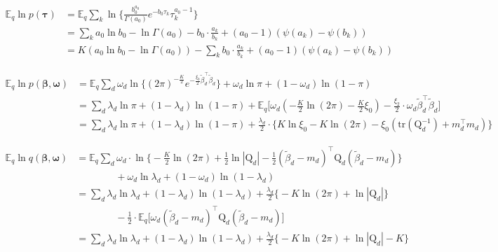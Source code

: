 \documentclass[twoside,11pt]{article}
\newcommand{\transpose}[1]{#1^{\intercal}}
\newcommand{\ksum}{\sum\limits_{k}}
\newcommand{\boldbeta}{\boldsymbol\beta}
\newcommand{\boldomega}{\boldsymbol\omega}
\newcommand{\boldtau}{\boldsymbol\tau}
\newcommand{\E}{\mathbb{E}}
\newcommand{\betad}{\tilde{\beta}_d}
\newcommand{\qmat}{\mathrm{Q}}
\newcommand{\trace}[1]{\mathrm{tr} \left( #1 \right)}
\begin{document}
\begin{align*}
	\E_q \ln p\left( \boldtau \right) &= \E_q \ksum \ln \Big\{ \frac{b_0^{a_0}}{\Gamma(a_0)} e^{-b_0 \tau_k} \tau_k^{a_0 - 1} \Big\} \\
	&= \ksum a_0 \ln b_0 - \ln \Gamma(a_0) - b_0 \cdot \frac{a_k}{b_k} + (a_0 - 1) \left( \psi(a_k) - \psi(b_k) \right) \\
	&= K \left( a_0 \ln b_0 - \ln \Gamma(a_0) \right) - \ksum b_0 \cdot \frac{a_k}{b_k} + (a_0 - 1) \left( \psi(a_k) - \psi(b_k) \right)
\end{align*}


\begin{align*}
	\E_q \ln p\left( \boldbeta, \boldomega \right) &= \E_q \sum_d \omega_d \ln \Big\{ (2\pi)^{-\frac{K}{2}} e^{-\frac{\xi_0}{2} \transpose{\betad} \betad}\Big\} + \omega_d \ln \pi + (1 - \omega_d) \ln \left( 1 - \pi \right) \\
	&= \sum_d \lambda_d \ln \pi + (1 - \lambda_d) \ln (1 - \pi) + \E_q \Big[ \omega_d \left( - \frac{K}{2} \ln (2\pi) - \frac{K}{2} \xi_0 \right) - \frac{\xi_2}{2} \cdot \omega_d \transpose{\betad} \betad\Big] \\
	&= \sum_d \lambda_d \ln \pi + (1 - \lambda_d) \ln (1 - \pi) + \frac{\lambda_d}{2} \cdot \Big\{ K \ln \xi_0 - K \ln (2 \pi) - \xi_0 \left( \trace{\qmat_d^{-1}} + \transpose{m_d}m_d \right) \Big\}
\end{align*}


\begin{align*}
	\E_q \ln q\left( \boldbeta, \boldomega \right) &=  \E_q \sum_d \omega_d \cdot \ln \Big\{ -\frac{K}{2} \ln (2\pi) + \frac{1}{2} \ln |\qmat_d | - \frac{1}{2} \transpose{\left( \betad - m_d \right)} \qmat_d \left( \betad - m_d \right) \Big\} \\
	& \qquad \qquad  + \omega_d \ln \lambda_d + (1 - \omega_d) \ln (1 - \lambda_d) \\
	&= \sum_d \lambda_d \ln \lambda_d + (1 - \lambda_d) \ln (1-\lambda_d) + \frac{\lambda_d}{2} \Big\{ - K \ln (2\pi) + \ln |\qmat_d|\Big\} \\
	& \qquad \qquad  - \frac{1}{2} \cdot \E_q \Big[ \omega_d \transpose{\left( \betad - m_d \right)} \qmat_d \left( \betad - m_d \right) \Big] \\
	&= \sum_d \lambda_d \ln \lambda_d + (1 - \lambda_d) \ln (1-\lambda_d) + \frac{\lambda_d}{2} \Big\{ - K \ln (2\pi) + \ln |\qmat_d| - K\Big\}
\end{align*}
\end{document}
